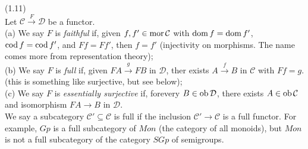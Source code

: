 \documentclass[a4paper]{article}
\begin{document}
\begin{defi} (1.11)\\
    Let $\mathcal{C} \xrightarrow{F} \mathcal{D}$ be a functor.\\
    (a) We say $F$ is \emph{faithful} if, given $f,f' \in \operatorname{mor} \mathcal{C}$ with $\operatorname{dom} f = \operatorname{dom} f'$, $\operatorname{cod} f = \operatorname{cod} f'$, and $Ff = Ff'$, then $f=f'$ (injectivity on morphisms. The name comes more from representation theory);\\
    (b) We say $F$ is \emph{full} if, given $FA \xrightarrow{g} FB$ in $\mathcal{D}$, ther exists $A \xrightarrow{f} B$ in $\mathcal{C}$ with $Ff = g$. (this is something like surjective, but see below);\\
    (c) We say  $F$ is \emph{essentially surjective} if, forevery $B \in \operatorname{ob} \mathcal{D}$, there exists $A \in \operatorname{ob} \mathcal{C}$ and isomorphism $FA \to B$ in $\mathcal{D}$.\\
    We say a subcategory $\mathcal{C}' \subseteq \mathcal{C}$ is full if the inclusion $\mathcal{C}' \to \mathcal{C}$ is a full functor. For example, $Gp$ is a full subcategory of $Mon$ (the category of all monoids), but $Mon$ is not a full subcategory of the category $SGp$ of semigroups.
\end{defi}
\end{document}

